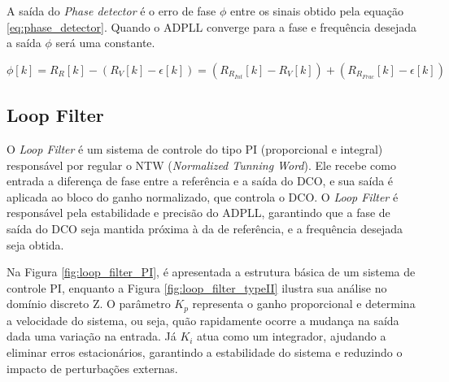 A saída do \textit{Phase detector } é o erro de fase $\phi$ entre os sinais obtido pela equação \ref{eq:phase_detector}. Quando o ADPLL converge para a fase e frequência desejada a saída $\phi$ será uma constante.

 \begin{equation}
	\phi [k]= R_R[k] - ( R_V[k] - \epsilon[k]) =  (R_{R_{Int}}[k] - R_V[k]) + ( R_{R_{Frac}}[k] - \epsilon[k])
	\label{eq:phase_detector}
\end{equation}
\subsection{Loop Filter}
\label{sec:loop_filter}

O \textit{Loop Filter} é um sistema de controle do tipo PI (proporcional e integral) responsável por regular o NTW (\textit{Normalized Tunning Word}). Ele recebe como entrada a diferença de fase entre a referência e a saída do DCO, e sua saída é aplicada ao bloco do ganho normalizado, que controla o DCO. O \textit{Loop Filter} é responsável pela estabilidade e precisão do ADPLL, garantindo que a fase de saída do DCO seja mantida próxima à da de referência, e a frequência desejada seja obtida.

Na Figura \ref{fig:loop_filter_PI}, é apresentada a estrutura básica de um sistema de controle PI, enquanto a Figura \ref{fig:loop_filter_typeII} ilustra sua análise no domínio discreto Z. O parâmetro $K_p$ representa o ganho proporcional e determina a velocidade do sistema, ou seja, quão rapidamente ocorre a mudança na saída dada uma variação na entrada. Já $K_i$ atua como um integrador, ajudando a eliminar erros estacionários, garantindo a estabilidade do sistema e reduzindo o impacto de perturbações externas.

